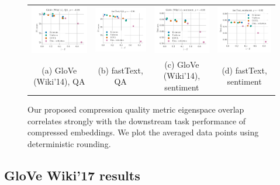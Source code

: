 \begin{figure}
	\footnotesize
	\begin{tabular}{@{\hskip -0.0in}c@{\hskip -0.0in}c@{\hskip -0.0in}c@{\hskip -0.0in}c@{\hskip -0.0in}}
		\includegraphics[width=.245\linewidth]{figures/glove400k_qa_best-f1_vs_subspace-dist-normalized_linx_det_ave-pt.pdf} &
		\includegraphics[width=.245\linewidth]{figures/fasttext1m_qa_best-f1_vs_subspace-dist-normalized_linx_det_ave-pt.pdf} &
		\includegraphics[width=.245\linewidth]{figures/glove400k_sentiment_sst_test-acc_vs_subspace-dist-normalized_linx_det_ave-pt.pdf} &
		\includegraphics[width=.245\linewidth]{figures/fasttext1m_sentiment_sst_test-acc_vs_subspace-dist-normalized_linx_det_ave-pt.pdf}	\\
		(a) GloVe (Wiki'14), QA & \;\;\;\;(b) fastText, QA  & \;\;\;\;\;\;(c) GloVe (Wiki'14), sentiment & \;\;\;\;\;(d) fastText, sentiment 
	\end{tabular}
	\caption{Our proposed compression quality metric eigenspace overlap correlates strongly with the downstream task performance of compressed embeddings. We plot the averaged data points using deterministic rounding.}
	\label{fig:good_correlation_det_ave_pt}
\end{figure}

\subsection{GloVe Wiki'17 results}
\label{subsec:glove_wiki17}

